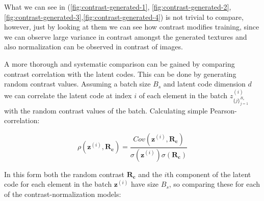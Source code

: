 \documentclass[12pt, english]{article}
\begin{document}
\par What we can see in (\ref{fig:contrast-generated-1}, \ref{fig:contrast-generated-2}, \ref{fig:contrast-generated-3},\ref{fig:contrast-generated-4}) is not trivial to compare, however, just by looking at them we can see how contrast modifies training, since we can observe large variance in contrast amongst the generated textures and also normalization can be observed in contrast of images.

\vspace{4mm}

\par A more thorough and systematic comparison can be gained by comparing contrast correlation with the latent codes. This can be done by generating random contrast values. Assuming a batch size $B_{s}$ and latent code dimension $d$ we can correlate the latent code at index $i$ of each element in the batch $z^{(i)}_{\{j\}_{j = 1}^{B_{s}}}$ with the random contrast values of the batch. Calculating simple Pearson-correlation:

\vspace{4mm}

\begin{equation*}
    \rho(\bm{z}^{(i)}, \bm{R_{c}}) = \frac{Cov(\bm{z}^{(i)}, \bm{R_{c}})}{\sigma(\bm{z}^{(i)})\sigma(\bm{R_{c}})}  
\end{equation*}

\vspace{4mm}

\par In this form both the random contrast $\bm{R_{c}}$ and the $i$th component of the latent code for each element in the batch $\bm{z}^{(i)}$ have size $B_{s}$, so comparing these for each of the contrast-normalization models:

\vspace{4mm}
\end{document}

